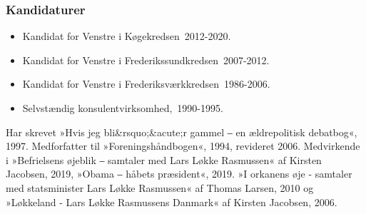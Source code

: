\documentclass[11pt, a4paper]{awesome-cv}
\begin{document}
\begin{cvletter}
\subsubsection*{Kandidaturer}
\begin{itemize}
\item Kandidat for Venstre i Køgekredsen 2012-2020.
\item Kandidat for Venstre i Frederikssundkredsen 2007-2012.
\item Kandidat for Venstre i Frederiksværkkredsen 1986-2006.
\end{itemize}
\begin{itemize}
\item Selvstændig konsulentvirksomhed, 1990-1995.
\end{itemize}
Har skrevet »Hvis jeg bli&rsquo;&acute;r gammel ‒ en ældrepolitisk debatbog«, 1997. Medforfatter til »Foreningshåndbogen«, 1994, revideret 2006. Medvirkende i  »Befrielsens øjeblik ‒ samtaler med Lars Løkke Rasmussen« af Kirsten Jacobsen, 2019, »Obama ‒ håbets præsident«, 2019. »I orkanens øje - samtaler med statsminister Lars Løkke Rasmussen« af Thomas Larsen, 2010 og »Løkkeland - Lars Løkke Rasmussens Danmark« af Kirsten Jacobsen, 2006.

\end{cvletter}
\end{document}
